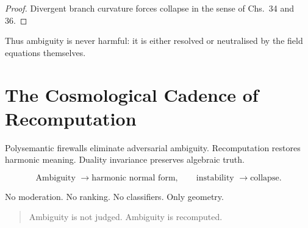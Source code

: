 \begin{proof}
Divergent branch curvature forces collapse in the sense of Chs.~34 and 36.
\end{proof}

Thus ambiguity is never harmful:
it is either resolved or neutralised by the field equations themselves.

\section{The Cosmological Cadence of Recomputation}

Polysemantic firewalls eliminate adversarial ambiguity.
Recomputation restores harmonic meaning.
Duality invariance preserves algebraic truth.

\[
\text{Ambiguity } \longrightarrow \text{harmonic normal form}, \qquad
\text{instability } \longrightarrow \text{collapse}.
\]

No moderation.
No ranking.
No classifiers.
Only geometry.

\begin{quote}
Ambiguity is not judged.  
Ambiguity is recomputed.
\end{quote}
